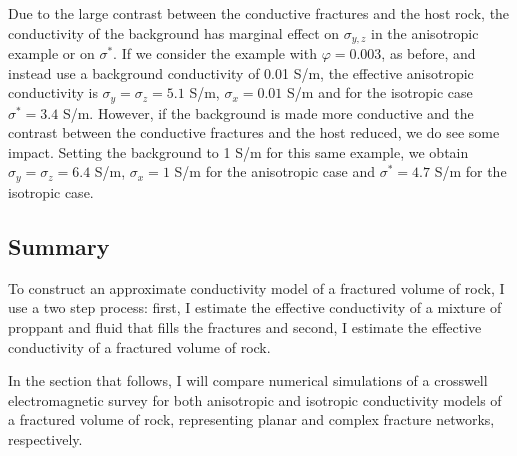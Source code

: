 Due to the large contrast between the conductive fractures and the host rock, the conductivity of the background has marginal effect on $\sigma_{y, z}$ in the anisotropic example or on $\sigma^*$. If we consider the example with $\varphi = 0.003$, as before, and instead use a background conductivity of 0.01 S/m, the effective anisotropic conductivity is $\sigma_y = \sigma_z = 5.1$ S/m, $\sigma_x = 0.01$ S/m and for the isotropic case $\sigma^* = 3.4$ S/m. However, if the background is made more conductive and the contrast between the conductive fractures and the host reduced, we do see some impact. Setting the background to 1 S/m for this same example, we obtain $\sigma_y = \sigma_z = 6.4$ S/m, $\sigma_x = 1$ S/m for the anisotropic case and $\sigma^* = 4.7$ S/m for the isotropic case.


\subsection{Summary}
To construct an approximate conductivity model of a fractured volume of rock, I use a two step process: first, I estimate the effective conductivity of a mixture of proppant and fluid that fills the fractures and second, I estimate the effective conductivity of a fractured volume of rock.

In the section that follows, I will compare numerical simulations of a crosswell electromagnetic survey for both anisotropic and isotropic conductivity models of a fractured volume of rock, representing planar and complex fracture networks, respectively.


